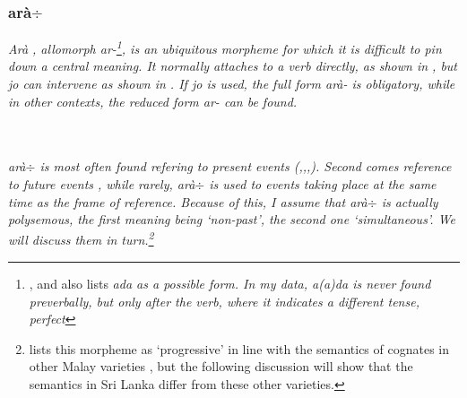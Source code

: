 \subsubsection{arà$\div$}\label{sec:morph:ara-}
\em Arà \em, allomorph \em ar-\em\footnote{\citet[31]{Adelaar1991}, \citep[143]{Slomanson2007cll} and \citet{Slomanson2008lingua} also lists \em ada \em  as a possible form. In my data, \em a(a)da \em is never found preverbally, but only after the verb, where it indicates a different tense, perfect },
is an ubiquitous morpheme for which it is difficult to pin down a central meaning. It normally attaches to a verb directly, as shown in , but \em jo \em can intervene as shown in . If \em jo \em is used, the full form \em arà- \em is obligatory, while in other contexts, the reduced form \em ar- \em can be found.


 \\

 \\

\em arà$\div$ \em is most often found refering to present events (\citet{SmithEtAl2004},\citet[141]{Slomanson2007cll},\citet[164]{SmithEtAl2007},\citet{Ansaldo2009}). Second comes reference to future events \citep[164]{SmithEtAl2007}, while rarely, \em arà$\div$ \em is used to events taking place at the same time as the frame of reference. Because of this, I assume that \em arà$\div$ \em is actually polysemous, the first meaning being `non-past', the second one `simultaneous'. We will discuss them in turn.\footnote{\citet[31]{Adelaar1991} lists this morpheme as `progressive' in line with the semantics of cognates in other Malay varieties \citep{Adelaar2005struct}, but the following discussion will show that the semantics in Sri Lanka differ from these other varieties.}


